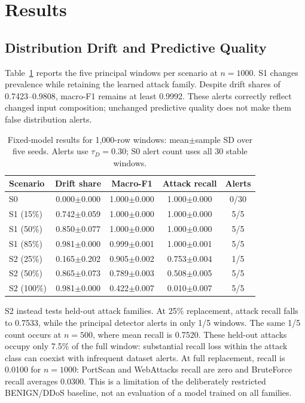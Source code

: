 \documentclass[runningheads]{llncs}
\begin{document}
\section{Results}
\label{sec:results}
\subsection{Distribution Drift and Predictive Quality}
Table~\ref{tab:results} reports the five principal windows per scenario at $n=1000$. S1 changes prevalence while retaining the learned attack family. Despite drift shares of 0.7423--0.9808, macro-F1 remains at least 0.9992. These alerts correctly reflect changed input composition; unchanged predictive quality does not make them false distribution alerts.

\begin{table}[t]
\caption{Fixed-model results for 1,000-row windows: mean$\pm$sample SD over five seeds. Alerts use $\tau_D=0.30$; S0 alert count uses all 30 stable windows.}
\label{tab:results}
\centering
\small
\begin{tabular*}{\linewidth}{@{\extracolsep{\fill}}lcccc@{}}
\toprule
Scenario & Drift share & Macro-F1 & Attack recall & Alerts \\
\midrule
S0 & 0.000$\pm$0.000 & 1.000$\pm$0.000 & 1.000$\pm$0.000 & 0/30 \\
S1 (15\%) & 0.742$\pm$0.059 & 1.000$\pm$0.000 & 1.000$\pm$0.000 & 5/5 \\
S1 (50\%) & 0.850$\pm$0.077 & 1.000$\pm$0.000 & 1.000$\pm$0.000 & 5/5 \\
S1 (85\%) & 0.981$\pm$0.000 & 0.999$\pm$0.001 & 1.000$\pm$0.001 & 5/5 \\
S2 (25\%) & 0.165$\pm$0.202 & 0.905$\pm$0.002 & 0.753$\pm$0.004 & 1/5 \\
S2 (50\%) & 0.865$\pm$0.073 & 0.789$\pm$0.003 & 0.508$\pm$0.005 & 5/5 \\
S2 (100\%) & 0.981$\pm$0.000 & 0.422$\pm$0.007 & 0.010$\pm$0.007 & 5/5 \\
\bottomrule
\end{tabular*}
\end{table}

S2 instead tests held-out attack families. At 25\% replacement, attack recall falls to 0.7533, while the principal detector alerts in only 1/5 windows. The same 1/5 count occurs at $n=500$, where mean recall is 0.7520. These held-out attacks occupy only 7.5\% of the full window: substantial recall loss within the attack class can coexist with infrequent dataset alerts. At full replacement, recall is 0.0100 for $n=1000$: PortScan and WebAttacks recall are zero and BruteForce recall averages 0.0300. This is a limitation of the deliberately restricted BENIGN/DDoS baseline, not an evaluation of a model trained on all families.
\end{document}
